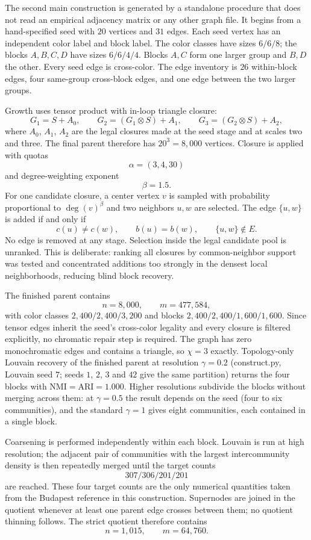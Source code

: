 \documentclass[12pt]{article}
\begin{document}
The second main construction is generated by a standalone procedure that does
not read an empirical adjacency matrix or any other graph file. It begins from
a hand-specified seed with $20$ vertices and $31$ edges. Each seed vertex has
an independent color label and block label. The color classes have sizes
$6/6/8$; the blocks $A,B,C,D$ have sizes $6/6/4/4$. Blocks $A,C$ form one
larger group and $B,D$ the other. Every seed edge is cross-color. The edge
inventory is $26$ within-block edges, four same-group cross-block edges, and
one edge between the two larger groups.

Growth uses tensor product with in-loop triangle closure:
\[
G_1=S+A_0,
\qquad
G_2=(G_1\otimes S)+A_1,
\qquad
G_3=(G_2\otimes S)+A_2,
\]
where $A_0$, $A_1$, $A_2$ are the legal closures made at the seed stage
and at scales two and three.
The final parent therefore has $20^3=8{,}000$ vertices. Closure is applied with
quotas
\[
\alpha=(3,4,30)
\]
and degree-weighting exponent
\[
\beta=1.5.
\]
For one candidate closure, a center vertex $v$ is sampled with probability
proportional to $\deg(v)^\beta$ and two neighbors $u,w$ are selected. The edge
$\{u,w\}$ is added if and only if
\[
c(u)\neq c(w),
\qquad
b(u)=b(w),
\qquad
\{u,w\}\notin E.
\]
No edge is removed at any stage. Selection inside the legal candidate pool is
unranked. This is deliberate: ranking all closures by common-neighbor support
was tested and concentrated additions too strongly in the densest local
neighborhoods, reducing blind block recovery.

The finished parent contains
\[
n=8{,}000,
\qquad
m=477{,}584,
\]
with color classes $2{,}400/2{,}400/3{,}200$ and blocks
$2{,}400/2{,}400/1{,}600/1{,}600$. Since tensor edges inherit the seed's
cross-color legality and every closure is filtered explicitly, no chromatic
repair step is required. The graph has zero monochromatic edges and contains a
triangle, so $\chi=3$ exactly. Topology-only Louvain recovery of the finished
parent at resolution $\gamma=0.2$ (construct.py, Louvain seed $7$; seeds $1$,
$2$, $3$ and $42$ give the same partition) returns the four blocks with
$\mathrm{NMI}=\mathrm{ARI}=1.000$. Higher resolutions subdivide the blocks
without merging across them: at $\gamma=0.5$ the result depends on the seed
(four to six communities), and the standard $\gamma=1$ gives eight
communities, each contained in a single block.

Coarsening is performed independently within each block.   Louvain is run at
   high resolution; the adjacent pair of communities with the largest
   intercommunity density is then repeatedly merged until the target counts
\[
307/306/201/201
\]
are reached. These four target counts are the only numerical quantities taken
from the Budapest reference in this construction. Supernodes are joined in
the quotient whenever at least one parent edge crosses between them; no
quotient thinning follows. The strict quotient therefore contains
\[
n=1{,}015,
\qquad
m=64{,}760.
\]
\end{document}
